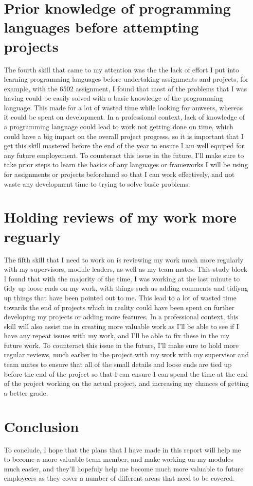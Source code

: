 \documentclass{scrartcl}
\begin{document}
\section{Prior knowledge of programming languages before attempting projects}
The fourth skill that came to my attention was the the lack of effort I put into learning programming languages before undertaking assignments and projects, for example, with the 6502 assignment, I found that most of the problems that I was having could be easily solved with a basic knowledge of the programming language. This made for a lot of wasted time while looking for anwsers, whereas it could be spent on development. In a professional context, lack of knowledge of a programming language could lead to work not getting done on time, which could have a big impact on the overall project progress, so it is important that I get this skill mastered before the end of the year to ensure I am well equiped for any future employement. To counteract this issue in the future, I'll make sure to take prior steps to learn the basics of any languages or frameworks I will be using for assignments or projects beforehand so that I can work effectively, and not waste any development time to trying to solve basic problems. 


\section{Holding reviews of my work more reguarly}
The fifth skill that I need to work on is reviewing my work much more regularly with my supervisors, module leaders, as well as my team mates. This study block I found that with the majority of the time, I was working at the last minute to tidy up loose ends on my work, with things such as adding comments and tidiyng up things that have been pointed out to me. This lead to a lot of wasted time towards the end of projects which in reality could have been spent on further developing my projects or adding more features. In a professional context, this skill will also assist me in creating more valuable work as I'll be able to see if I have any repeat issues with my work, and I'll be able to fix these in the my future work. To counteract this issue in the future, I'll make sure to hold more regular reviews, much earlier in the project with my work with my supervisor and team mates to ensure that all of the small details and loose ends are tied up before the end of the project so that I can ensure I can spend the time at the end of the project working on the actual project, and increasing my chances of getting a better grade.

\section{Conclusion}
To conclude, I hope that the plans that I have made in this report will help me to become a more valuable team member, and make working on my modules much easier, and they'll hopefuly help me become much more valuable to future employeers as they cover a number of different areas that need to be covered. 







\end{document}
